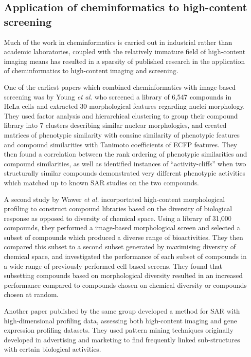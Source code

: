 \documentclass[a4paper,11pt,twoside,openright]{scrbook}
\begin{document}
\subsection{Application of cheminformatics to high-content screening}
Much of the work in cheminformatics is carried out in industrial rather than academic laboratories, coupled with the relatively immature field of high-content imaging means has resulted in a sparsity of published research in the application of cheminformatics to high-content imaging and screening.

One of the earliest papers which combined cheminformatics with image-based screening was by Young \textit{et al.}\cite{Young2008} who screened a library of 6,547 compounds in HeLa cells and extracted 30 morphological features regarding nuclei morphology.
They used factor analysis and hierarchical clustering to group their compound library into 7 clusters describing similar nuclear morphologies, and created matrices of phenotypic similarity with consine similarity of phenotypic features and compound similarities with Tanimoto coefficients of ECFP features.
They then found a correlation between the rank ordering of phenotypic similarities and compound similarities, as well as identified instances of ``activity-cliffs'' when two structurally similar compounds demonstrated very different phenotypic activities which matched up to known SAR studies on the two compounds.

A second study by Wawer \textit{et al.}\cite{Wawer2014b} incorportated high-content morphological profiling to construct compound libraries based on the diversity of biological response as opposed to diversity of chemical space.
Using a library of 31,000 compounds, they performed a image-based morphological screen and selected a subset of compounds which produced a diverse range of bioactivities.
They then compared this subset to a second subset generated by maximising diversity of chemical space, and investigated the performance of each subset of compounds in a wide range of previously performed cell-based screens.
They found that subsetting compounds based on morphological diversity resulted in an increased performance compared to compounds chosen on chemical diversity or compounds chosen at random.

Another paper published by the same group\cite{Wawer2014c} developed a method for SAR with high-dimensional profiling data, assessing both high-content imaging and gene expression profiling datasets.
They used pattern mining techniques originally developed in advertising and marketing to find frequently linked sub-structures with certain biological activities.
\end{document}
